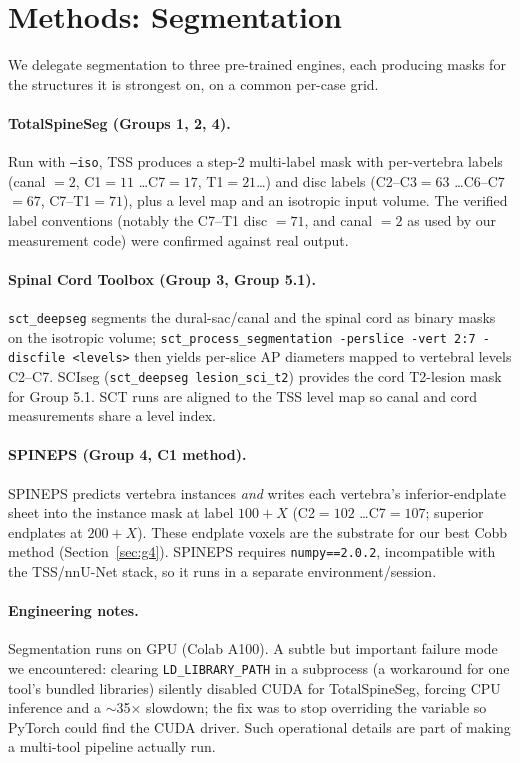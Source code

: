 \section{Methods: Segmentation}
\label{sec:seg}

We delegate segmentation to three pre-trained engines, each producing masks for the structures it is
strongest on, on a common per-case grid.

\paragraph{TotalSpineSeg (Groups 1, 2, 4).} Run with \texttt{--iso}, TSS produces a step-2 multi-label
mask with per-vertebra labels (canal $=2$, C1$=11$ \ldots C7$=17$, T1$=21$\ldots) and disc labels
(C2--C3$=63$ \ldots C6--C7$=67$, C7--T1$=71$), plus a level map and an isotropic input volume. The
verified label conventions (notably the C7--T1 disc $=71$, and canal $=2$ as used by our measurement
code) were confirmed against real output.

\paragraph{Spinal Cord Toolbox (Group 3, Group 5.1).} \texttt{sct\_deepseg} segments the dural-sac/canal
and the spinal cord as binary masks on the isotropic volume; \texttt{sct\_process\_segmentation
-perslice -vert 2:7 -discfile <levels>} then yields per-slice AP diameters mapped to vertebral levels
C2--C7. SCIseg (\texttt{sct\_deepseg lesion\_sci\_t2}) provides the cord T2-lesion mask for Group 5.1.
SCT runs are aligned to the TSS level map so canal and cord measurements share a level index.

\paragraph{SPINEPS (Group 4, C1 method).} SPINEPS predicts vertebra instances \emph{and} writes each
vertebra's inferior-endplate sheet into the instance mask at label $100+X$ (C2$=102$ \ldots C7$=107$;
superior endplates at $200+X$). These endplate voxels are the substrate for our best Cobb method
(Section~\ref{sec:g4}). SPINEPS requires \texttt{numpy==2.0.2}, incompatible with the TSS/nnU-Net stack,
so it runs in a separate environment/session.

\paragraph{Engineering notes.} Segmentation runs on GPU (Colab A100). A subtle but important failure mode
we encountered: clearing \texttt{LD\_LIBRARY\_PATH} in a subprocess (a workaround for one tool's bundled
libraries) silently disabled CUDA for TotalSpineSeg, forcing CPU inference and a $\sim$35$\times$
slowdown; the fix was to stop overriding the variable so PyTorch could find the CUDA driver. Such
operational details are part of making a multi-tool pipeline actually run.
